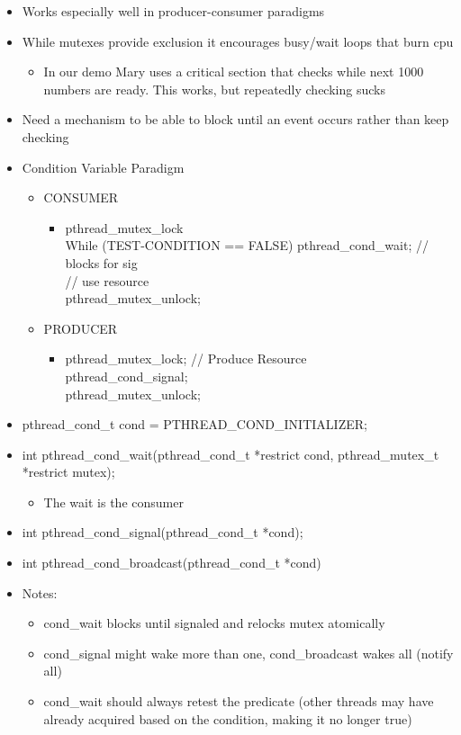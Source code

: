 \begin{itemize}
    \item Works especially well in producer-consumer paradigms
    \item While mutexes provide exclusion it encourages busy/wait loops that burn cpu
    \begin{itemize}
        \item In our demo Mary uses a critical section that checks while next 1000 numbers are ready. This works, but repeatedly checking sucks
    \end{itemize}
    \item Need a mechanism to be able to block until an event occurs rather than keep checking
    \item Condition Variable Paradigm
    \begin{itemize}
        \item CONSUMER
        \begin{itemize}
            \item pthread\_mutex\_lock\\While (TEST-CONDITION == FALSE) pthread\_cond\_wait; // blocks for sig\\// use resource\\pthread\_mutex\_unlock;
        \end{itemize}
        \item PRODUCER
        \begin{itemize}
            \item pthread\_mutex\_lock; // Produce Resource\\
            pthread\_cond\_signal;\\
            pthread\_mutex\_unlock;
        \end{itemize}
    \end{itemize}
    \item pthread\_cond\_t cond = PTHREAD\_COND\_INITIALIZER;
    \item int pthread\_cond\_wait(pthread\_cond\_t *restrict cond, pthread\_mutex\_t *restrict mutex);
    \begin{itemize}
        \item The wait is the consumer
    \end{itemize}
    \item int pthread\_cond\_signal(pthread\_cond\_t *cond);
    \item int pthread\_cond\_broadcast(pthread\_cond\_t *cond)
    \item Notes:
    \begin{itemize}
        \item cond\_wait blocks until signaled and relocks mutex atomically
        \item cond\_signal might wake more than one, cond\_broadcast wakes all (notify all)
        \item cond\_wait should always retest the predicate (other threads may have already acquired based on the condition, making it no longer true)
    \end{itemize}
\end{itemize}
